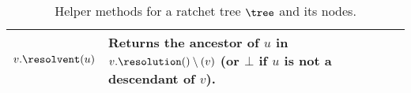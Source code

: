 \begin{table*}[!t]
\begin{minipage}{\textwidth}
\begin{tabularx}{.48\textwidth}{| l | X |}
  		\hline
  		$v.\resolvent(u)$ & Returns the ancestor of $u$ in $v.\resolution() \setminus (v)$ (or $\bot$ if $u$ is not a descendant of $v$).\\
  		\hline
  	\end{tabularx}
	  \caption{Helper methods for a ratchet tree $\tree$ and its nodes.\vspace{-1em}}
	  \label{tab:node_helpers}
  \end{minipage}
\end{table*}
